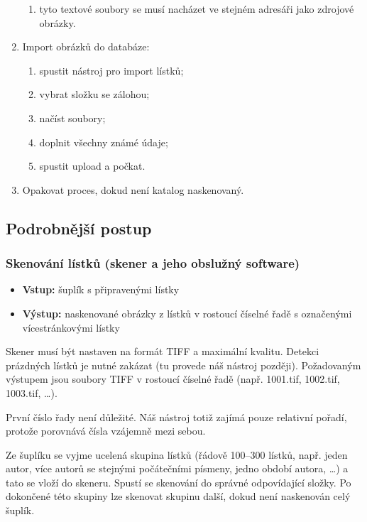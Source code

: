\begin{enumerate}
\begin{enumerate}
\item{tyto textové soubory se musí nacházet ve stejném adresáři jako zdrojové obrázky.}
\end{enumerate}
\item{Import obrázků do databáze:}
\begin{enumerate}
\item{spustit nástroj pro import lístků;}
\item{vybrat složku se zálohou;}
\item{načíst soubory;}
\item{doplnit všechny známé údaje;}
\item{spustit upload a počkat.}
\end{enumerate}
\item{Opakovat proces, dokud není katalog naskenovaný.}
\end{enumerate}

\subsection{Podrobnější postup}

\subsubsection{Skenování lístků (skener a jeho obslužný software)}

\begin{itemize}
\item{{\bf Vstup:} šuplík s připravenými lístky}
\item{{\bf Výstup:} naskenované obrázky z lístků v rostoucí číselné řadě s označenými vícestránkovými lístky}
\end{itemize}

Skener musí být nastaven na formát TIFF a maximální kvalitu. Detekci prázdných lístků je nutné zakázat (tu provede náš nástroj později). Požadovaným výstupem jsou soubory TIFF v rostoucí číselné řadě (např. 1001.tif, 1002.tif, 1003.tif, \ldots). 

{\color{OliveGreen} První číslo řady není důležité. Náš nástroj totiž zajímá pouze relativní pořadí, protože porovnává čísla vzájemně mezi sebou.}

Ze šuplíku se vyjme ucelená skupina lístků (řádově 100--300 lístků, např. jeden autor, více autorů se stejnými počátečními písmeny, jedno období autora, \ldots) a tato se vloží do skeneru. Spustí se skenování do správné odpovídající složky. Po dokončené této skupiny lze skenovat skupinu další, dokud není naskenován celý šuplík. 

